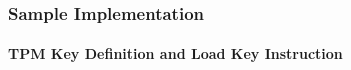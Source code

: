 \documentclass{beamer}
\begin{document}
%   

\begin{frame}[fragile]
  \frametitle{Sample Implementation}
  \framesubtitle{TPM Key Definition and Load Key Instruction}
  \begin{tiny}
  
  
  \end{tiny}
\end{frame}

%  
\end{document}
